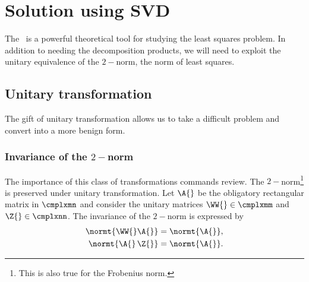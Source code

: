 \section{Solution using SVD}
\label{sec:ls:SVD}
The \asvd \ is a powerful theoretical tool for studying the least squares problem. In addition to needing the decomposition products, we will need to exploit the unitary equivalence of the $2-$norm, the norm of least squares.

\subsection{Unitary transformation}
The gift of unitary transformation allows us to take a difficult problem and convert into a more benign form. 

\subsubsection{Invariance of the $2-$norm}
The importance of this class of transformations commands review. The $2-$norm\footnote{This is also true for the Frobenius norm.} is preserved under unitary transformation. Let $\A{}$ be the obligatory rectangular matrix in $\cmplxmn$ and consider the unitary matrices $\WW{} \in \cmplxmm$ and $\Z{} \in \cmplxnn$. The invariance of the $2-$norm is expressed by 
\begin{equation}
\begin{split}
  \normt{ \WW{} \A{} } &= \normt{ \A{} }, \\
  \normt{ \A{}\,\Z{} } &= \normt{ \A{} }.
\end{split}
\end{equation}

